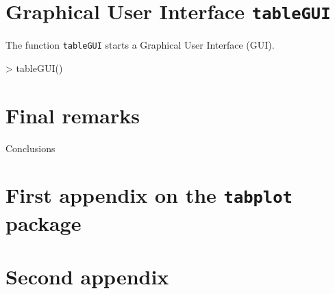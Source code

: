 \documentclass[11pt, fleqn, a4paper]{article}
\begin{document}
\section{Graphical User Interface {\tt tableGUI}}
The function {\tt tableGUI} starts a Graphical User Interface (GUI).
\begin{Schunk}
\begin{Sinput}
> tableGUI()
\end{Sinput}
\end{Schunk}




\section{Final remarks}
Conclusions


%
%

\newpage
\appendix
\section{First appendix on the {\tt tabplot} package}
\section{Second appendix}
\end{document}
